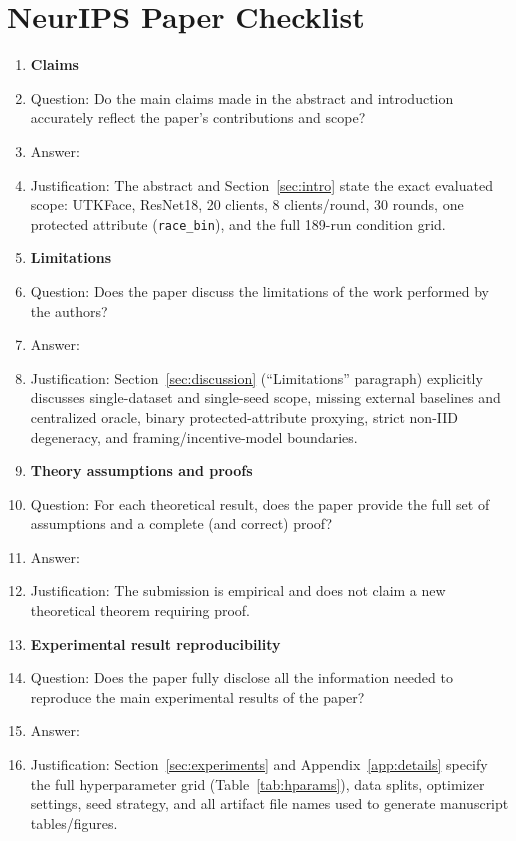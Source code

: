 \section*{NeurIPS Paper Checklist}


\begin{enumerate}

\item {\bf Claims}
    \item[] Question: Do the main claims made in the abstract and introduction accurately reflect the paper's contributions and scope?
    \item[] Answer: \answerYes{}
    \item[] Justification: The abstract and Section~\ref{sec:intro} state the exact evaluated scope: UTKFace, ResNet18, 20 clients, 8 clients/round, 30 rounds, one protected attribute (\texttt{race\_bin}), and the full 189-run condition grid.

\item {\bf Limitations}
    \item[] Question: Does the paper discuss the limitations of the work performed by the authors?
    \item[] Answer: \answerYes{}
    \item[] Justification: Section~\ref{sec:discussion} (``Limitations'' paragraph) explicitly discusses single-dataset and single-seed scope, missing external baselines and centralized oracle, binary protected-attribute proxying, strict non-IID degeneracy, and framing/incentive-model boundaries.

\item {\bf Theory assumptions and proofs}
    \item[] Question: For each theoretical result, does the paper provide the full set of assumptions and a complete (and correct) proof?
    \item[] Answer: \answerNA{}
    \item[] Justification: The submission is empirical and does not claim a new theoretical theorem requiring proof.

\item {\bf Experimental result reproducibility}
    \item[] Question: Does the paper fully disclose all the information needed to reproduce the main experimental results of the paper?
    \item[] Answer: \answerYes{}
    \item[] Justification: Section~\ref{sec:experiments} and Appendix~\ref{app:details} specify the full hyperparameter grid (Table~\ref{tab:hparams}), data splits, optimizer settings, seed strategy, and all artifact file names used to generate manuscript tables/figures.


\end{enumerate}
